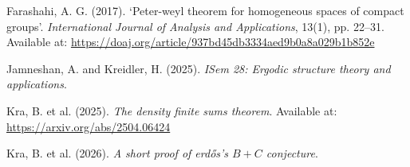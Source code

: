 \documentclass[
  british,
]{article}
\newlength{\cslhangindent}
\newenvironment{CSLReferences}[2] %
 {\begin{list}{}{%
  \setlength{\itemindent}{0pt}
  \setlength{\leftmargin}{0pt}
  \setlength{\parsep}{0pt}
  \ifodd #1
   \setlength{\leftmargin}{\cslhangindent}
   \setlength{\itemindent}{-1\cslhangindent}
  \fi
  \setlength{\itemsep}{#2\baselineskip}}}
 {\end{list}}
\theoremstyle{plain}
\theoremstyle{plain}
\theoremstyle{plain}
\theoremstyle{definition}
\theoremstyle{remark}
\begin{document}
\protect{}\label{refs}
\begin{CSLReferences}{1}{0}
Farashahi, A. G. (2017). `Peter-weyl theorem for homogeneous spaces of
compact groups'. \emph{International Journal of Analysis and
Applications}, 13(1), pp. 22--31. Available at:
\url{https://doaj.org/article/937bd45db3334aed9b0a8a029b1b852e}

Jamneshan, A. and Kreidler, H. (2025). \emph{ISem 28: Ergodic structure
theory and applications}.

Kra, B. et al. (2025). \emph{The density finite sums theorem}. Available
at: \url{https://arxiv.org/abs/2504.06424}

Kra, B. et al. (2026). \emph{A short proof of erdős's \(B+C\)
conjecture}.

\end{CSLReferences}
\end{document}
